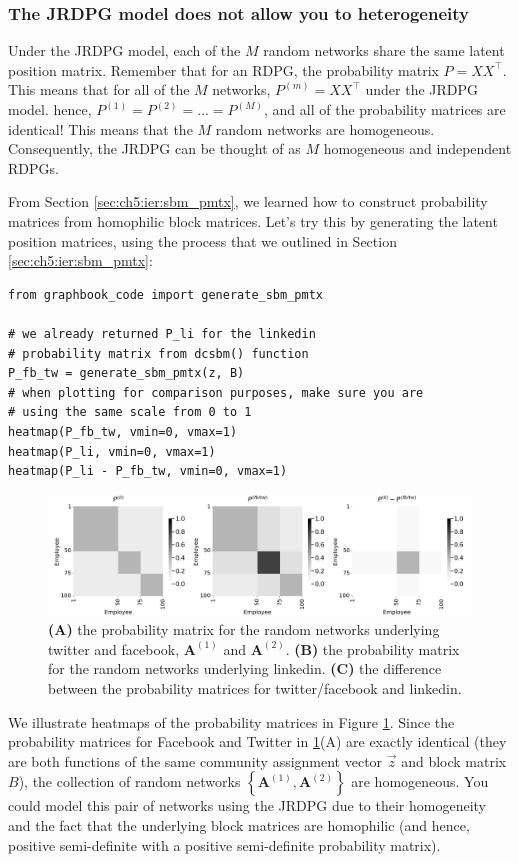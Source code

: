 \subsubsection{The JRDPG model does not allow you to heterogeneity}

Under the JRDPG model, each of the $M$ random networks share the same latent position matrix. Remember that for an RDPG, the probability matrix $P = XX^\top$. This means that for all of the $M$ networks, $P^{(m)} = XX^\top$ under the JRDPG model. hence, $P^{(1)} = P^{(2)} = ... = P^{(M)}$, and {all} of the probability matrices are {identical}! This means that the $M$ random networks are {homogeneous}. Consequently, the JRDPG can be thought of as $M$ homogeneous and independent RDPGs.

From Section \ref{sec:ch5:ier:sbm_pmtx}, we learned how to construct probability matrices from homophilic block matrices. Let's try this by generating the latent position matrices, using the process that we outlined in Section \ref{sec:ch5:ier:sbm_pmtx}:

\begin{lstlisting}[style=python]
from graphbook_code import generate_sbm_pmtx

# we already returned P_li for the linkedin
# probability matrix from dcsbm() function
P_fb_tw = generate_sbm_pmtx(z, B)
# when plotting for comparison purposes, make sure you are
# using the same scale from 0 to 1
heatmap(P_fb_tw, vmin=0, vmax=1)
heatmap(P_li, vmin=0, vmax=1)
heatmap(P_li - P_fb_tw, vmin=0, vmax=1)
\end{lstlisting}

\begin{figure}[h]
    \centering
    \includegraphics[width=\linewidth]{representations/ch5/Images/het.png}
    \caption[Heterogeneous random network probability matrices]{\textbf{(A)} the probability matrix for the random networks underlying twitter and facebook, $\mathbf A^{(1)}$ and $\mathbf A^{(2)}$. \textbf{(B)} the probability matrix for the random networks underlying linkedin. \textbf{(C)} the difference between the probability matrices for twitter/facebook and linkedin.}
    \label{fig:ch5:het}
\end{figure}
We illustrate heatmaps of the probability matrices in Figure \ref{fig:ch5:het}. Since the probability matrices for Facebook and Twitter in \ref{fig:ch5:het}(A) are exactly identical (they are both functions of the same community assignment vector $\vec z$ and block matrix $B$), the collection of random networks $\left\{\mathbf A^{(1)}, \mathbf A^{(2)}\right\}$ are homogeneous. You could model this pair of networks using the JRDPG due to their homogeneity and the fact that the underlying block matrices are homophilic (and hence, positive semi-definite with a positive semi-definite probability matrix).


